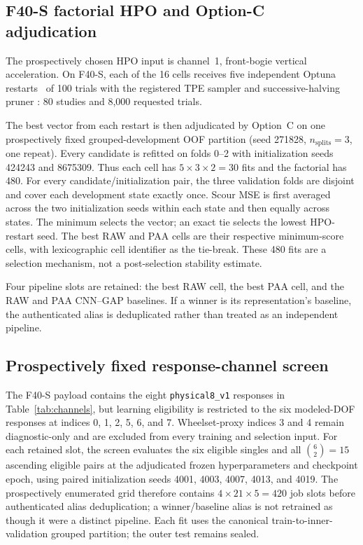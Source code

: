 \subsection{F40-S factorial HPO and Option-C adjudication}
\label{sec:hpo}

The prospectively chosen HPO input is channel~1, front-bogie vertical
acceleration. On F40-S, each of the 16 cells receives five independent Optuna
restarts~\cite{akiba2019optuna} of 100 trials with the registered TPE sampler
\cite{bergstra2011algorithms} and successive-halving pruner
\cite{jamieson2016non}: 80 studies and 8,000 requested trials.

The best vector from each restart is then adjudicated by Option~C on one
prospectively fixed grouped-development OOF partition (seed 271828,
$n_{\mathrm{splits}}=3$, one repeat). Every candidate is refitted on folds
0--2 with initialization seeds 424243 and 8675309. Thus each cell has
$5\times3\times2=30$ fits and the factorial has 480. For every
candidate/initialization pair, the three validation folds are disjoint and
cover each development state exactly once. Scour MSE is first averaged across
the two initialization seeds within each state and then equally across states.
The minimum selects the vector; an exact tie selects the lowest HPO-restart
seed. The best RAW and PAA cells are their respective minimum-score cells, with
lexicographic cell identifier as the tie-break. These 480 fits are a selection
mechanism, not a post-selection stability estimate.

Four pipeline slots are retained: the best RAW cell, the best PAA cell, and the
RAW and PAA CNN--GAP baselines. If a winner is its representation's baseline,
the authenticated alias is deduplicated rather than treated as an independent
pipeline.

\subsection{Prospectively fixed response-channel screen}
\label{sec:channel_design}

The F40-S payload contains the eight \texttt{physical8\_v1} responses in
Table~\ref{tab:channels}, but learning eligibility is restricted to the six
modeled-DOF responses at indices 0, 1, 2, 5, 6, and 7. Wheelset-proxy indices 3
and 4 remain diagnostic-only and are excluded from every training and selection
input. For each retained slot, the screen evaluates the six eligible singles
and all $\binom{6}{2}=15$ ascending eligible pairs at the adjudicated frozen
hyperparameters and checkpoint epoch, using paired initialization seeds
4001, 4003, 4007, 4013, and 4019. The prospectively enumerated grid therefore
contains $4\times21\times5=420$ job slots before authenticated alias
deduplication; a winner/baseline alias is not retrained as though it were a
distinct pipeline. Each fit uses the canonical train-to-inner-validation
grouped partition; the outer test remains sealed.

